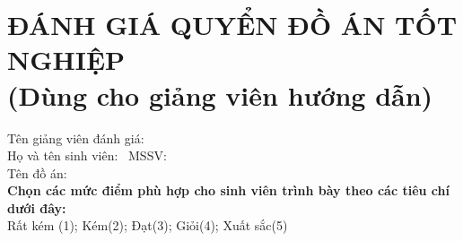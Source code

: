 \section*{ĐÁNH GIÁ QUYỂN ĐỒ ÁN TỐT NGHIỆP\\\fontsize{14pt}{0pt}\selectfont \vspace{4pt}\textnormal{(Dùng cho giảng viên hướng dẫn)}}
\thispagestyle{empty}
\vspace{-16pt}
\hspace{-1cm}Tên giảng viên đánh giá: \dotfill\\
Họ và tên sinh viên:\,\,\,\dotfill \hspace{15pt} MSSV:\,\,\,\dotfill\\
Tên đồ án: \dotfill\\
\textbf{Chọn các mức điểm phù hợp cho sinh viên trình bày theo các tiêu chí dưới đây:}\\
Rất kém (1); Kém(2); Đạt(3); Giỏi(4); Xuất sắc(5)
